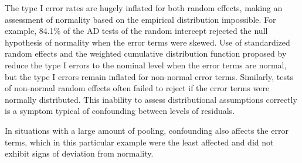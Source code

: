 \documentclass[12pt]{article} %
\begin{document}
The type I error rates are hugely inflated for both random effects, making an assessment of normality based on the empirical distribution impossible. 
For example, 84.1\% of the AD tests of the random intercept rejected the null hypothesis of normality when the error terms were skewed.
 Use of standardized random effects and the weighted cumulative distribution function proposed by \cite{Lange:1989uu} reduce the type I errors to the nominal level when the error terms are normal, but the type I errors remain inflated for non-normal error terms.  
Similarly, tests of non-normal random effects often failed to reject if the error terms were normally distributed. 
This inability to assess distributional assumptions correctly is a symptom typical of confounding between levels of residuals.

In situations with a large amount of pooling, confounding also affects the error terms, which in this particular example were the least affected and did not exhibit signs of deviation from normality.
\end{document}
